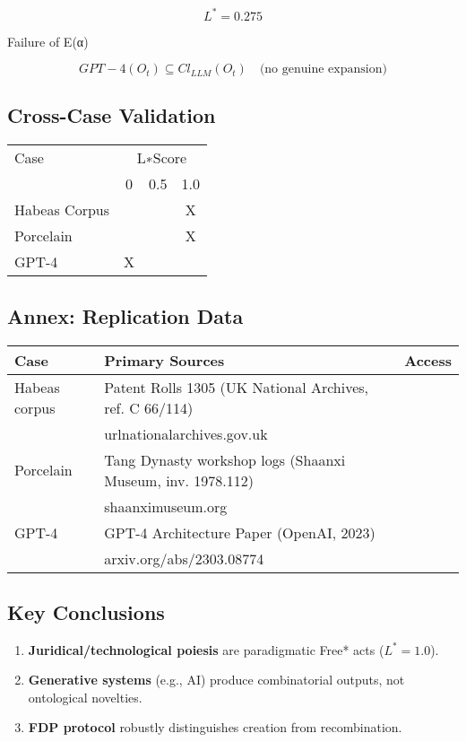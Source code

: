\documentclass[11pt,a4paper]{article}
\begin{document}
\[
L^{*}= 0.275
\]

Failure of E(α)

\[
GPT-4(O_t) \subseteq Cl_{LLM}(O_t) \quad \text{(no genuine expansion)}
\]

\subsection{Cross-Case Validation}\label{sec:case-comparison}

\begin{tabular}{l c c c}
Case & \multicolumn{3}{c}{L∗Score} \\
& 0 & 0.5 & 1.0 \\
\hline
Habeas Corpus & & & X \\
Porcelain & & & X \\
GPT-4 & X & & \\
\end{tabular}

\subsection{Annex: Replication Data}\label{sec:case-data}

\begin{tabular}{l l l}
Case & Primary Sources & Access \\
\hline
Habeas corpus & Patent Rolls 1305 (UK National Archives, ref. C 66/114) \\ & urlnationalarchives.gov.uk \\
Porcelain & Tang Dynasty workshop logs (Shaanxi Museum, inv. 1978.112) \\ & shaanximuseum.org \\
GPT-4 & GPT-4 Architecture Paper (OpenAI, 2023) \\& arxiv.org/abs/2303.08774 \\
\end{tabular}

\subsection{Key Conclusions}\label{sec:case-conclusions}

\begin{enumerate}
  \item \textbf{Juridical/technological poiesis} are paradigmatic Free* acts (\(L^{*}=1.0\)).
  \item \textbf{Generative systems} (e.g., AI) produce combinatorial outputs, not ontological novelties.
  \item \textbf{FDP protocol} robustly distinguishes creation from recombination.
\end{enumerate}
\end{document}
